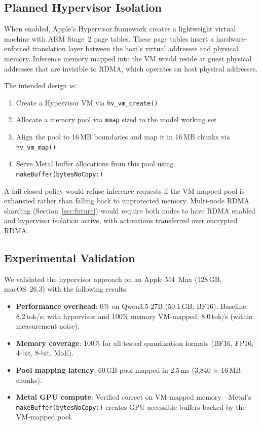 \documentclass[10pt,twocolumn,letterpaper]{article}
\begin{document}
\subsection{Planned Hypervisor Isolation}

When enabled, Apple's Hypervisor.framework creates a lightweight virtual machine with ARM Stage~2 page tables. These page tables insert a hardware-enforced translation layer between the host's virtual addresses and physical memory. Inference memory mapped into the VM would reside at guest physical addresses that are invisible to RDMA, which operates on host physical addresses.

The intended design is:
\begin{enumerate}[leftmargin=*,itemsep=1pt]
    \item Create a Hypervisor VM via \texttt{hv\_vm\_create()}
    \item Allocate a memory pool via \texttt{mmap} sized to the model working set
    \item Align the pool to 16\,MB boundaries and map it in 16\,MB chunks via \texttt{hv\_vm\_map()}
    \item Serve Metal buffer allocations from this pool using \texttt{makeBuffer(bytesNoCopy:)}
\end{enumerate}

A fail-closed policy would refuse inference requests if the VM-mapped pool is exhausted rather than falling back to unprotected memory. Multi-node RDMA sharding (Section~\ref{sec:future}) would require both nodes to have RDMA enabled and hypervisor isolation active, with activations transferred over encrypted RDMA.

\subsection{Experimental Validation}

We validated the hypervisor approach on an Apple M4~Max (128\,GB, macOS~26.3) with the following results:
\begin{itemize}[leftmargin=*,itemsep=1pt]
    \item \textbf{Performance overhead}: 0\% on Qwen3.5-27B (50.1\,GB, BF16). Baseline: 8.2\,tok/s; with hypervisor and 100\% memory VM-mapped: 8.0\,tok/s (within measurement noise).
    \item \textbf{Memory coverage}: 100\% for all tested quantization formats (BF16, FP16, 4-bit, 8-bit, MoE).
    \item \textbf{Pool mapping latency}: 60\,GB pool mapped in 2.5\,ms (3,840 $\times$ 16\,MB chunks).
    \item \textbf{Metal GPU compute}: Verified correct on VM-mapped memory---Metal's \texttt{makeBuffer(bytesNoCopy:)} creates GPU-accessible buffers backed by the VM-mapped pool.
\end{itemize}
\end{document}
